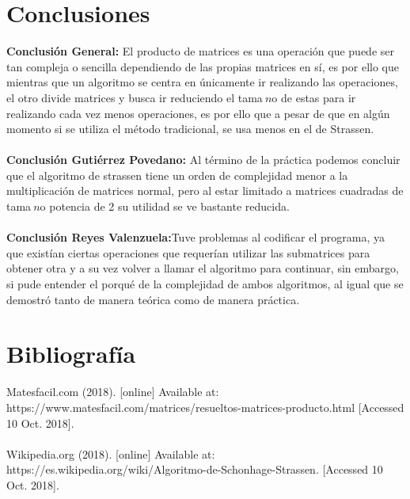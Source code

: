 \documentclass[12pt,twoside]{article}
\begin{document}
\section{Conclusiones}
\textbf{Conclusi\'on General: } El producto de matrices es una operaci\'on que puede ser tan compleja o sencilla dependiendo de las propias matrices en s\'i, es por ello que mientras que un algoritmo se centra en \'unicamente ir realizando las operaciones, el otro divide matrices y busca ir reduciendo el tama$~{n}$o de estas para ir realizando cada vez menos operaciones, es por ello que a pesar de que en alg\'un momento si se utiliza el m\'etodo tradicional, se usa menos en el de Strassen.\\\\
\textbf{Conclusi\'on Guti\'errez Povedano: }Al t\'ermino de la pr\'actica podemos concluir que el algoritmo de strassen tiene un orden de complejidad menor a la multiplicaci\'on de matrices normal, pero al estar limitado a matrices cuadradas de tama$~{n}$o potencia de 2 su utilidad se ve bastante reducida.\\\\
\textbf{Conclusi\'on Reyes Valenzuela:}Tuve problemas al codificar el programa, ya que exist\'ian ciertas operaciones que requer\'ian utilizar las submatrices para obtener otra y a su vez volver a llamar el algoritmo para continuar, sin embargo, si pude entender el porqu\'e de la complejidad de ambos algoritmos, al igual que se demostr\'o tanto de manera te\'orica como de manera pr\'actica.
\section{Bibliograf\'ia}
Matesfacil.com (2018). [online] Available at: https://www.matesfacil.com/matrices/resueltos-matrices-producto.html [Accessed 10 Oct. 2018].\\\\
Wikipedia.org (2018). [online] Available at: https://es.wikipedia.org/wiki/Algoritmo-de-Schonhage-Strassen. [Accessed 10 Oct. 2018].
\end{document}
